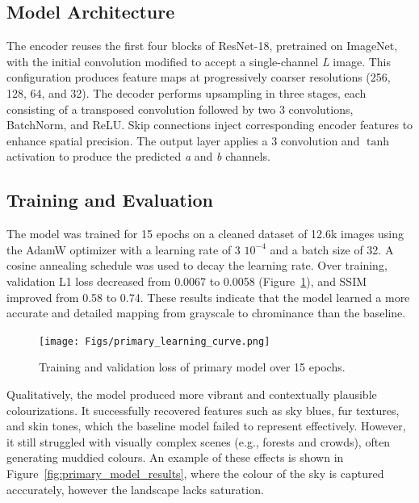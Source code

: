 \documentclass{article} %
\begin{document}
\subsection{Model Architecture}

The encoder reuses the first four blocks of ResNet-18, pretrained on ImageNet, with the initial convolution modified to accept a single-channel \textit{L} image. This configuration produces feature maps at progressively coarser resolutions (256, 128, 64, and 32). The decoder performs upsampling in three stages, each consisting of a transposed convolution followed by two 3 convolutions, BatchNorm, and ReLU. Skip connections inject corresponding encoder features to enhance spatial precision. The output layer applies a 3 convolution and $\tanh$ activation to produce the predicted \textit{a} and \textit{b} channels.

\subsection{Training and Evaluation}

The model was trained for 15 epochs on a cleaned dataset of 12.6k images using the AdamW optimizer with a learning rate of 3 \texttimes $10^{-4}$ and a batch size of 32. A cosine annealing schedule was used to decay the learning rate. Over training, validation L1 loss decreased from 0.0067 to 0.0058 (Figure~\ref{fig:primary_learning_curve}), and SSIM improved from 0.58 to 0.74. These results indicate that the model learned a more accurate and detailed mapping from grayscale to chrominance than the baseline.

\begin{figure}[htbp]
    \centering
    \texttt{[image: Figs/primary\_learning\_curve.png]}
    \caption{Training and validation loss of primary model over 15 epochs.}
    \label{fig:primary_learning_curve}
\end{figure}
\FloatBarrier

Qualitatively, the model produced more vibrant and contextually plausible colourizations. It successfully recovered features such as sky blues, fur textures, and skin tones, which the baseline model failed to represent effectively. However, it still struggled with visually complex scenes (e.g., forests and crowds), often generating muddied colours. An example of these effects is shown in Figure~\ref{fig:primary_model_results}, where the colour of the sky is captured acccurately, however the landscape lacks saturation.
\end{document}
